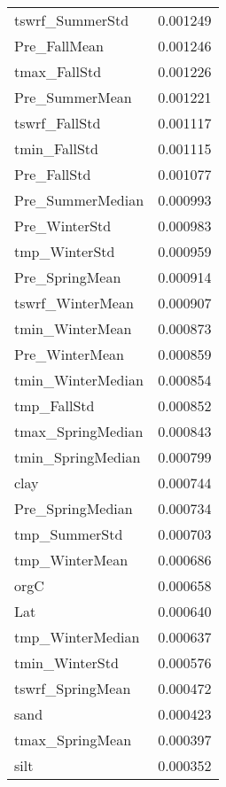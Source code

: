 \begin{tabular}{lr}
tswrf_SummerStd & 0.001249 \\
Pre_FallMean & 0.001246 \\
tmax_FallStd & 0.001226 \\
Pre_SummerMean & 0.001221 \\
tswrf_FallStd & 0.001117 \\
tmin_FallStd & 0.001115 \\
Pre_FallStd & 0.001077 \\
Pre_SummerMedian & 0.000993 \\
Pre_WinterStd & 0.000983 \\
tmp_WinterStd & 0.000959 \\
Pre_SpringMean & 0.000914 \\
tswrf_WinterMean & 0.000907 \\
tmin_WinterMean & 0.000873 \\
Pre_WinterMean & 0.000859 \\
tmin_WinterMedian & 0.000854 \\
tmp_FallStd & 0.000852 \\
tmax_SpringMedian & 0.000843 \\
tmin_SpringMedian & 0.000799 \\
clay & 0.000744 \\
Pre_SpringMedian & 0.000734 \\
tmp_SummerStd & 0.000703 \\
tmp_WinterMean & 0.000686 \\
orgC & 0.000658 \\
Lat & 0.000640 \\
tmp_WinterMedian & 0.000637 \\
tmin_WinterStd & 0.000576 \\
tswrf_SpringMean & 0.000472 \\
sand & 0.000423 \\
tmax_SpringMean & 0.000397 \\
silt & 0.000352 \\
\bottomrule
\end{tabular}
